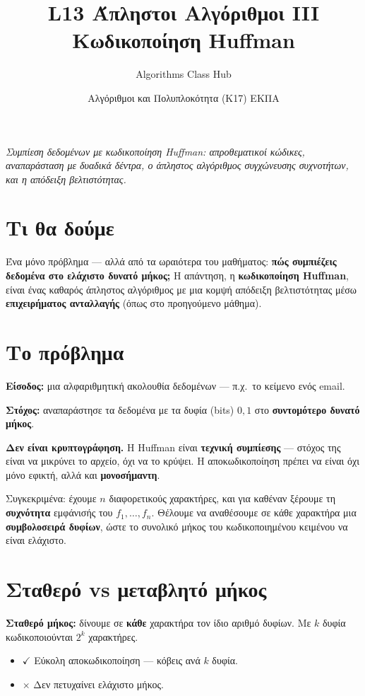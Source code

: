 \documentclass[11pt,a4paper]{article}
\title{\textbf{L13 \textperiodcentered{} Άπληστοι Αλγόριθμοι III}\\[2pt]
\large Κωδικοποίηση Huffman}
\author{Algorithms Class Hub}
\date{\small Αλγόριθμοι και Πολυπλοκότητα (K17) \textperiodcentered{} ΕΚΠΑ}
\begin{document}
\maketitle

\begin{center}\itshape\small
Συμπίεση δεδομένων με κωδικοποίηση Huffman: απροθεματικοί κώδικες, αναπαράσταση
με δυαδικά δέντρα, ο άπληστος αλγόριθμος συγχώνευσης συχνοτήτων, και η απόδειξη
βελτιστότητας.
\end{center}

\section{Τι θα δούμε}

Ένα μόνο πρόβλημα --- αλλά από τα ωραιότερα του μαθήματος: \textbf{πώς συμπιέζεις
δεδομένα στο ελάχιστο δυνατό μήκος;} Η απάντηση, η \textbf{κωδικοποίηση Huffman},
είναι ένας καθαρός άπληστος αλγόριθμος με μια κομψή απόδειξη βελτιστότητας μέσω
\textbf{επιχειρήματος ανταλλαγής} (όπως στο προηγούμενο μάθημα).

\section{Το πρόβλημα}

\textbf{Είσοδος:} μια αλφαριθμητική ακολουθία δεδομένων --- π.χ.\ το κείμενο ενός
email.

\textbf{Στόχος:} αναπαράστησε τα δεδομένα με τα δυφία (bits) $0, 1$ στο
\textbf{συντομότερο δυνατό μήκος}.

\begin{warningbox}
\textbf{Δεν είναι κρυπτογράφηση.} Η Huffman είναι \textbf{τεχνική συμπίεσης} ---
στόχος της είναι να μικρύνει το αρχείο, όχι να το κρύψει. Η αποκωδικοποίηση
πρέπει να είναι όχι μόνο εφικτή, αλλά και \textbf{μονοσήμαντη}.
\end{warningbox}

Συγκεκριμένα: έχουμε $n$ διαφορετικούς χαρακτήρες, και για καθέναν ξέρουμε τη
\textbf{συχνότητα} εμφάνισής του $f_1, \dots, f_n$. Θέλουμε να αναθέσουμε σε κάθε
χαρακτήρα μια \textbf{συμβολοσειρά δυφίων}, ώστε το συνολικό μήκος του
κωδικοποιημένου κειμένου να είναι ελάχιστο.

\section{Σταθερό vs μεταβλητό μήκος}

\textbf{Σταθερό μήκος:} δίνουμε σε \textbf{κάθε} χαρακτήρα τον ίδιο αριθμό
δυφίων. Με $k$ δυφία κωδικοποιούνται $2^k$ χαρακτήρες.
\begin{itemize}
  \item $\checkmark$ Εύκολη αποκωδικοποίηση --- κόβεις ανά $k$ δυφία.
  \item $\times$ Δεν πετυχαίνει ελάχιστο μήκος.
\end{itemize}
\end{document}
